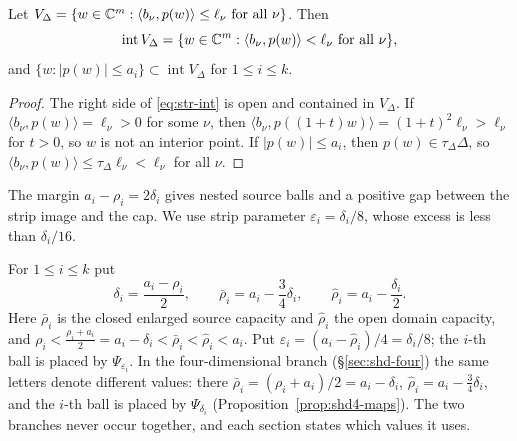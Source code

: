\begin{lemma}\label{lem:str-int}
Let $V_\Delta=\{w\in\mathbb{C}^m:\langle b_\nu,p(w)\rangle\le\ell_\nu\ \text{for all }\nu\}$. Then
\begin{equation}\label{eq:str-int}
 \operatorname{int}V_\Delta=\{w\in\mathbb{C}^m:\langle b_\nu,p(w)\rangle<\ell_\nu\ \text{for all }\nu\},
\end{equation}
and $\{w:|p(w)|\le a_i\}\subset\operatorname{int}V_\Delta$ for $1\le i\le k$.
\end{lemma}

\begin{proof}
The right side of \eqref{eq:str-int} is open and contained in $V_\Delta$. If $\langle b_\nu,p(w)\rangle=\ell_\nu>0$ for some $\nu$,
then $\langle b_\nu,p((1+t)w)\rangle=(1+t)^2\ell_\nu>\ell_\nu$ for $t>0$, so $w$ is not an interior point. If $|p(w)|\le a_i$, then
$p(w)\in\tau_\Delta\Delta$, so $\langle b_\nu,p(w)\rangle\le\tau_\Delta\ell_\nu<\ell_\nu$ for all $\nu$.
\end{proof}

The margin $a_i-\rho_i=2\delta_i$ gives nested source balls and a positive gap between
the strip image and the cap. We use strip parameter $\varepsilon_i=\delta_i/8$, whose excess
is less than $\delta_i/16$.

\begin{definition}\label{def:str-enlarged}
For $1\le i\le k$ put
\[
 \delta_i=\frac{a_i-\rho_i}2,\qquad
 \bar\rho_i=a_i-\frac34\delta_i,\qquad \hat\rho_i=a_i-\frac{\delta_i}2 .
\]
Here $\bar\rho_i$ is the closed enlarged source capacity and $\hat\rho_i$ the open domain capacity, and
$\rho_i<\frac{\rho_i+a_i}2=a_i-\delta_i<\bar\rho_i<\hat\rho_i<a_i$. Put
$\varepsilon_i=(a_i-\hat\rho_i)/4=\delta_i/8$; the $i$-th ball is placed by $\Psi_{\varepsilon_i}$.
In the four-dimensional branch (\S\ref{sec:shd-four}) the same letters denote different values:
there $\bar\rho_i=(\rho_i+a_i)/2=a_i-\delta_i$, $\hat\rho_i=a_i-\frac34\delta_i$, and the $i$-th ball is placed by
$\Psi_{\delta_i}$ (Proposition~\ref{prop:shd4-maps}). The two branches never occur together, and each section states which
values it uses.
\end{definition}

